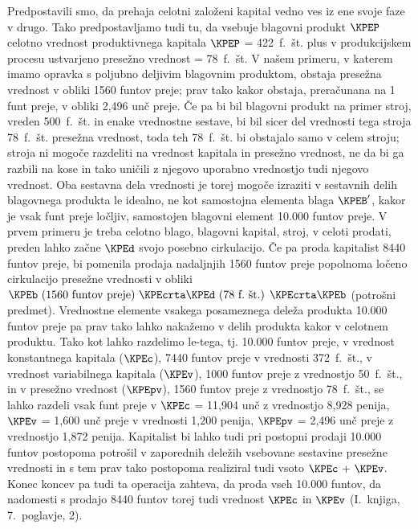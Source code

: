 \documentclass[kapital_02.tex]{subfiles}
\begin{document}
Predpostavili smo, da prehaja celotni založeni kapital vedno ves iz ene svoje faze v drugo. Tako predpostavljamo tudi tu, da vsebuje blagovni produkt \( \KPEP \) celotno vrednost produktivnega kapitala \( \KPEP \) = 422\ f.\ št. plus v produkcijskem procesu ustvarjeno presežno vrednost = 78\ f.\ št. V našem primeru, v \KPEstran katerem imamo opravka s poljubno deljivim blagovnim produktom, obstaja presežna vrednost v obliki 1560 funtov preje; prav tako kakor obstaja, preračunana na 1 funt preje, v obliki 2,496 unč preje. Če pa bi bil blagovni produkt na primer stroj, vreden 500\ f.\ št. in enake vrednostne sestave, bi bil sicer del vrednosti tega stroja 78\ f.\ št. presežna vrednost, toda teh 78\ f.\ št. bi obstajalo samo v celem stroju; stroja ni mogoče razdeliti na vrednost kapitala in presežno vrednost, ne da bi ga razbili na kose in tako uničili z njegovo uporabno vrednostjo tudi njegovo vrednost. Oba sestavna dela vrednosti je torej mogoče izraziti v sestavnih delih blagovnega produkta le idealno, ne kot samostojna elementa blaga \( \KPEB' \), kakor je vsak funt preje ločljiv, samostojen blagovni element 10.000 funtov preje. V prvem primeru je treba celotno blago, blagovni kapital, stroj, v celoti prodati, preden lahko začne \( \KPEd \) svojo posebno cirkulacijo. Če pa proda kapitalist 8440 funtov preje, bi pomenila prodaja nadaljnjih 1560 funtov preje popolnoma ločeno cirkulacijo presežne vrednosti v obliki \( \KPEb \textrm{ (1560 funtov preje) }\KPEcrta\KPEd \textrm{ (78\ f.\ št.) } \KPEcrta\KPEb\) (potrošni predmet). Vrednostne elemente vsakega posameznega deleža produkta 10.000 funtov preje pa prav tako lahko nakažemo v delih produkta kakor v celotnem produktu. Tako kot lahko razdelimo le-tega, tj. 10.000 funtov preje, v vrednost konstantnega kapitala (\( \KPEc \)), 7440 funtov preje v vrednosti 372\ f.\ št., v vrednost variabilnega kapitala (\( \KPEv \)), 1000 funtov preje z vrednostjo 50\ f.\ št., in v presežno vrednost (\( \KPEpv \)), 1560 funtov preje z vrednostjo 78\ f.\ št., se lahko razdeli vsak funt preje v \( \KPEc \) = 11,904 unč z vrednostjo 8,928 penija, \( \KPEv \) = 1,600 unč preje v vrednosti 1,200 penija, \( \KPEpv \) = 2,496 unč preje z vrednostjo 1,872 penija. Kapitalist bi lahko tudi pri postopni prodaji 10.000 funtov postopoma potrošil v zaporednih deležih vsebovane sestavine presežne vrednosti in s tem prav tako postopoma realiziral tudi vsoto \( \KPEc \textrm{ + } \KPEv \). Konec koncev pa tudi ta operacija zahteva, da proda vseh 10.000 funtov, da nadomesti s prodajo 8440 funtov torej tudi vrednost \( \KPEc \) in \( \KPEv \) (I.\ knjiga, 7.\ poglavje, 2).
\end{document}
